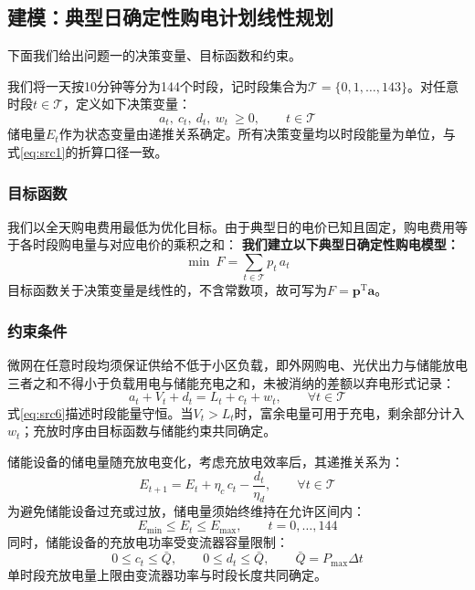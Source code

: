 \subsection{建模：典型日确定性购电计划线性规划}

下面我们给出问题一的决策变量、目标函数和约束。

我们将一天按10分钟等分为144个时段，记时段集合为$\mathcal{T}=\{0,1,\dots,143\}$。对任意时段$t\in\mathcal{T}$，定义如下决策变量：
\begin{equation}\label{eq:src4}
    a_{t},\ c_{t},\ d_{t},\ w_{t}\ \ge 0,\qquad t\in\mathcal{T}
\end{equation}
储电量$E_t$作为状态变量由递推关系确定。所有决策变量均以时段能量为单位，与式\eqref{eq:src1}的折算口径一致。

\subsubsection{目标函数}

我们以全天购电费用最低为优化目标。由于典型日的电价已知且固定，购电费用等于各时段购电量与对应电价的乘积之和：
\textbf{我们建立以下典型日确定性购电模型：}
\begin{equation}\label{eq:src5}
    \min\ F=\sum_{t\in\mathcal{T}} p_{t}\,a_{t}
\end{equation}
目标函数关于决策变量是线性的，不含常数项，故可写为$F=\bm{p}^{\mathrm{T}}\bm{a}$。

\subsubsection{约束条件}

微网在任意时段均须保证供给不低于小区负载，即外网购电、光伏出力与储能放电三者之和不得小于负载用电与储能充电之和，未被消纳的差额以弃电形式记录：
\begin{equation}\label{eq:src6}
    a_{t}+V_{t}+d_{t}=L_{t}+c_{t}+w_{t},\qquad \forall t\in\mathcal{T}
\end{equation}
式\eqref{eq:src6}描述时段能量守恒。当$V_t>L_t$时，富余电量可用于充电，剩余部分计入$w_t$；充放时序由目标函数与储能约束共同确定。

储能设备的储电量随充放电变化，考虑充放电效率后，其递推关系为：
\begin{equation}\label{eq:src7}
    E_{t+1}=E_{t}+\eta_{c}\,c_{t}-\frac{d_{t}}{\eta_{d}},\qquad \forall t\in\mathcal{T}
\end{equation}
为避免储能设备过充或过放，储电量须始终维持在允许区间内：
\begin{equation}\label{eq:src8}
    E_{\min}\le E_{t}\le E_{\max},\qquad t=0,\ldots,144
\end{equation}
同时，储能设备的充放电功率受变流器容量限制：
\begin{equation}\label{eq:src9}
    0\le c_{t}\le \bar{Q},\qquad 0\le d_{t}\le \bar{Q},\qquad \bar{Q}=P_{\max}\Delta t
\end{equation}
单时段充放电量上限由变流器功率与时段长度共同确定。

